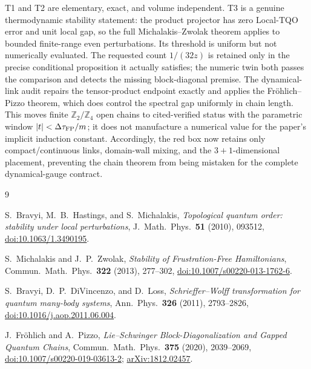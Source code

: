 T1 and T2 are elementary, exact, and volume independent.  T3 is a
genuine thermodynamic stability statement: the product projector has
zero Local-TQO error and unit local gap, so the full
Michalakis--Zwolak theorem applies to bounded finite-range even
perturbations.  Its threshold is uniform but not numerically evaluated.
The requested count $1/(32z)$ is retained only in the precise
conditional proposition it actually satisfies; the numeric twin both
passes the comparison and detects the missing block-diagonal premise.
The dynamical-link audit repairs the tensor-product endpoint exactly and
applies the Fröhlich--Pizzo theorem, which does control the spectral gap
uniformly in chain length.  This moves finite
$\mathbb Z_2/\mathbb Z_4$ open chains to cited-verified status with the
parametric window $|t|<\Delta\tau_{\rm FP}/m$; it does not manufacture a
numerical value for the paper's implicit induction constant.  Accordingly,
the red box now retains only compact/continuous links, domain-wall
mixing, and the $3+1$-dimensional placement, preventing the chain theorem
from being mistaken for the complete dynamical-gauge contract.

\begin{thebibliography}{9}

S.~Bravyi, M.~B.~Hastings, and S.~Michalakis,
\emph{Topological quantum order: stability under local perturbations},
J.\ Math.\ Phys.\ \textbf{51} (2010), 093512,
\href{https://doi.org/10.1063/1.3490195}
{doi:10.1063/1.3490195}.

S.~Michalakis and J.~P.~Zwolak,
\emph{Stability of Frustration-Free Hamiltonians},
Commun.\ Math.\ Phys.\ \textbf{322} (2013), 277--302,
\href{https://doi.org/10.1007/s00220-013-1762-6}
{doi:10.1007/s00220-013-1762-6}.

S.~Bravyi, D.~P.~DiVincenzo, and D.~Loss,
\emph{Schrieffer--Wolff transformation for quantum many-body systems},
Ann.\ Phys.\ \textbf{326} (2011), 2793--2826,
\href{https://doi.org/10.1016/j.aop.2011.06.004}
{doi:10.1016/j.aop.2011.06.004}.

J.~Fröhlich and A.~Pizzo,
\emph{Lie--Schwinger Block-Diagonalization and Gapped Quantum Chains},
Commun.\ Math.\ Phys.\ \textbf{375} (2020), 2039--2069,
\href{https://doi.org/10.1007/s00220-019-03613-2}
{doi:10.1007/s00220-019-03613-2};
\href{https://arxiv.org/abs/1812.02457}
{arXiv:1812.02457}.

\end{thebibliography}


